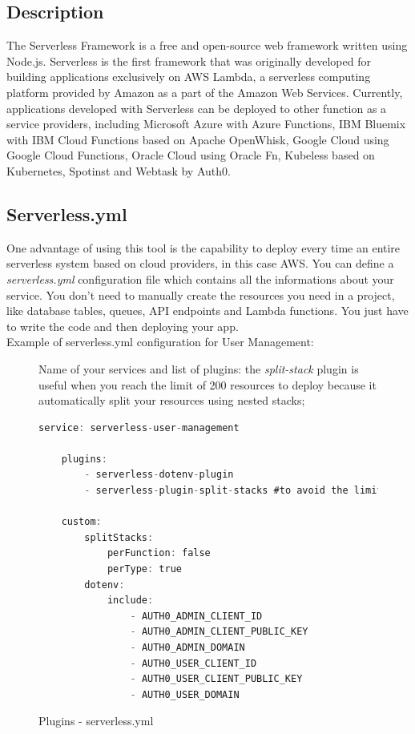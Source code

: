 \newpage
{}
\subsection{Description}
The Serverless Framework is a free and open-source web framework written using Node.js. Serverless is the first framework that was originally developed for building applications exclusively on AWS Lambda, a serverless computing platform provided by Amazon as a part of the Amazon Web Services. Currently, applications developed with Serverless can be deployed to other function as a service providers, including Microsoft Azure with Azure Functions, IBM Bluemix with IBM Cloud Functions based on Apache OpenWhisk, Google Cloud using Google Cloud Functions, Oracle Cloud using Oracle Fn, Kubeless based on Kubernetes, Spotinst and Webtask by Auth0.
\subsection{Serverless.yml}
One advantage of using this tool is the capability to deploy every time an entire serverless system based on cloud providers, in this case AWS. You can define a \emph{serverless.yml} configuration file which contains all the informations about your service. You don't need to manually create the resources you need in a project, like database tables, queues, API endpoints and Lambda functions. You just have to write the code and then deploying your app.\\

Example of serverless.yml configuration for User Management:\\

\begin{figure} [H]
Name of your services and list of plugins: the \emph{split-stack} plugin is useful when you reach the limit of 200 resources to deploy because it automatically split your resources using nested stacks;

\begin{lstlisting}[language=C]
	service: serverless-user-management
	
	plugins:
		- serverless-dotenv-plugin
		- serverless-plugin-split-stacks #to avoid the limit of 200 resources
	
	custom:
		splitStacks:
			perFunction: false
			perType: true
		dotenv: 
			include:
				- AUTH0_ADMIN_CLIENT_ID
				- AUTH0_ADMIN_CLIENT_PUBLIC_KEY
				- AUTH0_ADMIN_DOMAIN
				- AUTH0_USER_CLIENT_ID
				- AUTH0_USER_CLIENT_PUBLIC_KEY
				- AUTH0_USER_DOMAIN
\end{lstlisting}
	\caption{Plugins - serverless.yml}\label{}
\end{figure}


